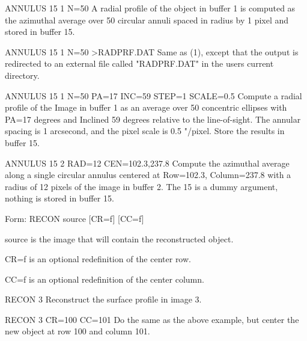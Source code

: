 {\newpage\clearpage
{}%
\begin{example}
  \item[ANNULUS 15 1 N=50\hfill]{A radial profile of the object in buffer 1
       is computed as the azimuthal average over 50 circular annuli spaced
       in radius by 1 pixel and stored in buffer 15.}
\par
\item[ANNULUS 15 1 N=50 >RADPRF.DAT\hfill]{Same as (1), except that the
       output is redirected to an external file called "RADPRF.DAT" in the
       users current directory.}
\par
\item[ANNULUS 15 1 N=50 PA=17 INC=59 STEP=1 SCALE=0.5\hfill]{Compute a
       radial profile of the Image in buffer 1 as an average over 50
       concentric ellipses with PA=17 degrees and Inclined 59 degrees
       relative to the line-of-sight.  The annular spacing is 1 arcsecond,
       and the pixel scale is 0.5 "/pixel.  Store the results in buffer
       15.}
\par
\item[ANNULUS 15 2 RAD=12 CEN=102.3,237.8\hfill]{Compute the azimuthal
       average along a single circular annulus centered at Row=102.3,
       Column=237.8 with a radius of 12 pixels of the image in buffer 2.
       The 15 is a dummy argument, nothing is stored in buffer 15.}
\end{example}%
\lthtmlfigureZ
\lthtmlcheckvsize\clearpage}

{\newpage\clearpage
{}%
\begin{command}
  \item[Form: RECON source {[CR=f]} {[CC=f]}\hfill]{}
  \item[source]{is the image that will contain the reconstructed object.}
  \item[CR=f]{is an optional redefinition of the center row.}
  \item[CC=f]{is an optional redefinition of the center column.}
\end{command}%
\lthtmlfigureZ
\lthtmlcheckvsize\clearpage}

{\newpage\clearpage
{}%
\begin{example}
  \item[RECON 3\hfill]{Reconstruct the surface profile in image 3.}
\par
\item[RECON 3 CR=100 CC=101\hfill]{Do the same as the above example,
       but center the new object at row 100 and column 101.}
\end{example}%
\lthtmlfigureZ
\lthtmlcheckvsize\clearpage}

